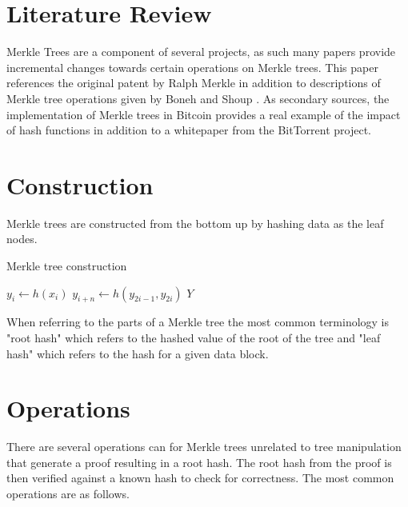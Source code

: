 \documentclass[12pt]{article}
\begin{document}
\section{Literature Review}

Merkle Trees are a component of several projects, as such many papers provide incremental changes towards certain operations on Merkle trees. This paper references the original patent by Ralph Merkle \cite{merkle-patent} in addition to descriptions of Merkle tree operations given by Boneh and Shoup \cite{boneh2020graduate}. As secondary sources, the implementation of Merkle trees in Bitcoin \cite{friedenbach_alm_2017} provides a real example of the impact of hash functions in addition to a whitepaper from the BitTorrent project\cite{bep30}.

\section{Construction}
 Merkle trees are constructed from the bottom up by hashing data as the leaf nodes.
 
 \begin{algorithm}[H]
 	\caption{Merkle tree construction}
 	\begin{algorithmic}
 		 
 		\State $y_i \leftarrow h(x_i)$  
 		\EndFor
 		   
 		\State $y_{i+n} \leftarrow h(y_{2i-1}, y_{2i}) $ 
 		\EndFor
 		\State \Return $Y$ 
 	\end{algorithmic}
 \end{algorithm}
 
When referring to the parts of a Merkle tree the most common terminology is "root hash" which refers to the hashed value of the root of the tree and "leaf hash" which refers to the hash for a given data block. 



\section{Operations}

There are several operations can for Merkle trees unrelated to tree manipulation that generate a proof resulting in a root hash. The root hash from the proof is then verified against a known hash to check for correctness. The most common operations are as follows.
\end{document}
